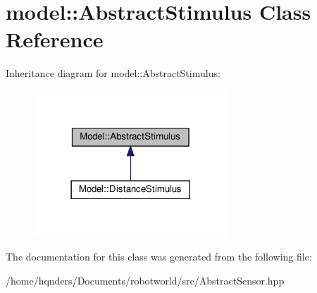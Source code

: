 \hypertarget{class_model_1_1_abstract_stimulus}{}\section{model\+:\+:Abstract\+Stimulus Class Reference}
\label{class_model_1_1_abstract_stimulus}


Inheritance diagram for model\+:\+:Abstract\+Stimulus\+:
\nopagebreak
\begin{figure}[H]
\begin{center}
\leavevmode
\includegraphics[width=206pt]{class_model_1_1_abstract_stimulus__inherit__graph}
\end{center}
\end{figure}


The documentation for this class was generated from the following file\+:\begin{DoxyCompactItemize}
\item 
/home/hqnders/\+Documents/robotworld/src/Abstract\+Sensor.\+hpp\end{DoxyCompactItemize}
